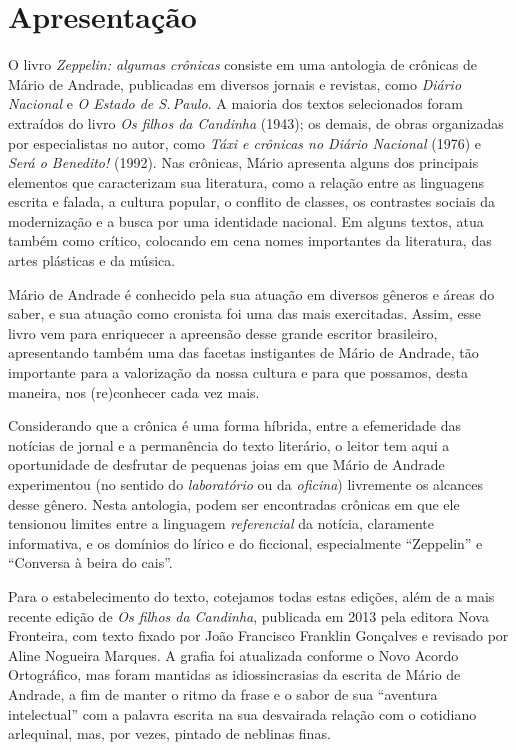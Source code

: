 \chapter[Apresentação \bigskip]{Apresentação}

O livro \emph{Zeppelin: algumas crônicas} consiste em uma antologia de crônicas de
Mário de Andrade, publicadas em diversos jornais e revistas, como
\emph{Diário Nacional} e \emph{O Estado de S.\,Paulo}. A maioria dos
textos selecionados foram extraídos do livro \emph{Os filhos da
Candinha} (1943); os demais, de obras organizadas por especialistas no
autor, como \emph{Táxi e crônicas no Diário Nacional} (1976) e
\emph{Será o Benedito!} (1992). Nas crônicas, Mário apresenta alguns dos
principais elementos que caracterizam sua literatura, como a relação
entre as linguagens escrita e falada, a cultura popular, o conflito de
classes, os contrastes sociais da modernização e a busca por uma
identidade nacional. Em alguns textos, atua também como crítico,
colocando em cena nomes importantes da literatura, das artes plásticas e
da música.

Mário de Andrade é conhecido pela sua atuação em diversos gêneros e
áreas do saber, e sua atuação como cronista foi uma das mais
exercitadas. Assim, esse livro vem para enriquecer a apreensão
desse grande escritor brasileiro,
apresentando também uma das facetas instigantes de Mário de Andrade,
tão importante para a valorização da nossa cultura e para
que possamos, desta maneira, nos (re)conhecer cada vez mais.

Considerando que a crônica é uma forma híbrida, entre a efemeridade das
notícias de jornal e a permanência do texto literário, o leitor tem aqui
a oportunidade de desfrutar de pequenas joias em que Mário de Andrade
experimentou (no sentido do \emph{laboratório} ou da \emph{oficina})
livremente os alcances desse gênero. Nesta antologia, podem ser
encontradas crônicas em que ele tensionou limites entre a linguagem
\emph{referencial} da notícia, claramente informativa, e os domínios do
lírico e do ficcional, especialmente ``Zeppelin'' e ``Conversa à beira
do cais''.

Para o estabelecimento do texto, cotejamos todas estas edições, além de
a mais recente edição de \emph{Os filhos da Candinha}, publicada em 2013
pela editora Nova Fronteira, com texto fixado por João Francisco
Franklin Gonçalves e revisado por Aline Nogueira Marques. A grafia foi
atualizada conforme o Novo Acordo Ortográfico, mas foram mantidas as
idiossincrasias da escrita de Mário de Andrade, a fim de manter o ritmo
da frase e o sabor de sua ``aventura intelectual'' com a palavra escrita
na sua desvairada relação com o cotidiano arlequinal, mas, por vezes,
pintado de neblinas finas.

